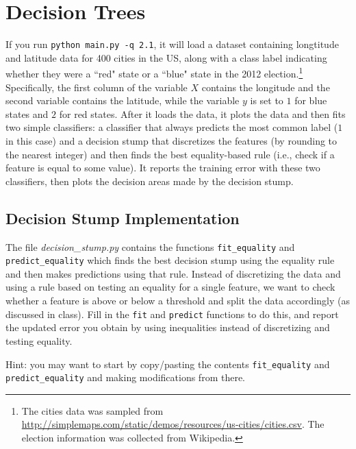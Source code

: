 \documentclass{article}
\def\blu#1{{\color{blu}#1}}
\begin{document}
\section{Decision Trees}

If you run \texttt{python main.py -q 2.1}, it will load a dataset containing longtitude and latitude data for 400 cities in the US, along with a class label indicating whether they were a ``red" state or a ``blue" state in the 2012 election.\footnote{The cities data was sampled from \url{http://simplemaps.com/static/demos/resources/us-cities/cities.csv}. The election information was collected from Wikipedia.}
Specifically, the first column of the variable $X$ contains the longitude and the second variable contains the latitude,
while the variable $y$ is set to $1$ for blue states and $2$ for red states.
After it loads the data, it plots the data and then fits two simple classifiers: a classifier that always predicts the
most common label ($1$ in this case) and a decision stump that discretizes the features (by rounding to the nearest integer)
and then finds the best equality-based rule (i.e., check if a feature is equal to some value).
It reports the training error with these two classifiers, then plots the decision areas made by the decision stump.

\subsection{Decision Stump Implementation}

The file \emph{decision\_stump.py} contains the functions \texttt{fit\string_equality} and \texttt{predict\string_equality} which finds the best decision stump using the equality rule and then makes predictions using that rule. Instead of discretizing the data and using a rule based on testing an equality for a single feature, we want to check whether a feature is above or below a threshold and split the data accordingly (as discussed in class). \blu{Fill in the \texttt{fit} and \texttt{predict} functions to do this, and report the updated error you obtain by using inequalities instead of discretizing and testing equality.}

Hint: you may want to start by copy/pasting the contents \texttt{fit\string_equality} and \texttt{predict\string_equality} and making modifications from there. %
\end{document}
